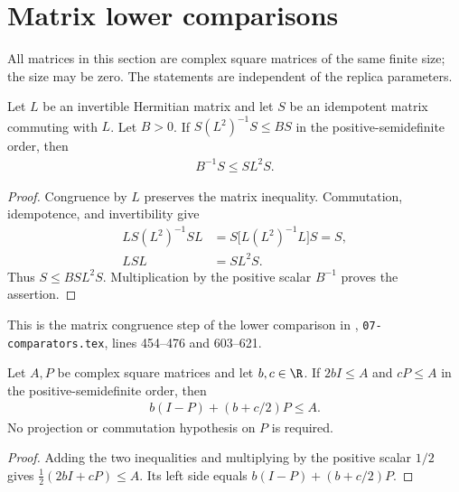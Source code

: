 \section{Matrix lower comparisons}

All matrices in this section are complex square matrices of the same finite
size; the size may be zero. The statements are independent of the replica
parameters.

\begin{theorem}
    \label{thm:area_law_compressed_inverse_floor}
    \leanok
    Let $L$ be an invertible Hermitian matrix and let $S$ be an
    idempotent matrix commuting with $L$. Let $B>0$. If
    $S(L^2)^{-1}S\le BS$ in the positive-semidefinite order, then
    \begin{align}
        B^{-1}S\le SL^2S.
    \end{align}
\end{theorem}

\begin{proof}\leanok
    Congruence by $L$ preserves the matrix inequality. Commutation,
    idempotence, and invertibility give
    \begin{align}
        LS(L^2)^{-1}SL
        &=S\bigl[L(L^2)^{-1}L\bigr]S=S,\\
        LSL&=SL^2S.
    \end{align}
    Thus $S\le BSL^2S$. Multiplication by the positive scalar
    $B^{-1}$ proves the assertion.
\end{proof}

This is the matrix congruence step of the lower comparison in
\cite{OpenAI2026AreaLaw}, \texttt{07-comparators.tex}, lines 454--476
and 603--621.

\begin{theorem}
    \label{thm:area_law_floor_pin}
    \leanok
    Let $A,P$ be complex square matrices and let $b,c\in\R$.
    If $2bI\le A$ and $cP\le A$ in the positive-semidefinite order, then
    \begin{align}
        b(I-P)+(b+c/2)P\le A.
    \end{align}
    No projection or commutation hypothesis on $P$ is required.
\end{theorem}

\begin{proof}\leanok
    Adding the two inequalities and multiplying by the positive scalar
    $1/2$ gives $\frac12(2bI+cP)\le A$. Its left side equals
    $b(I-P)+(b+c/2)P$.
\end{proof}

